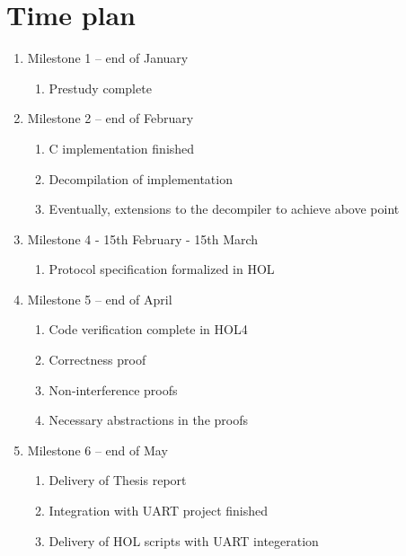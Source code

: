 \documentclass[fleqn]{kththesis}
\begin{document}
\section{Time plan}
\begin{enumerate}
\item Milestone 1 – end of January 
  \begin{enumerate}
      \item Prestudy complete
  \end{enumerate}
\item Milestone 2 – end of February
  \begin{enumerate}
      \item C implementation finished
      \item Decompilation of implementation
      \item Eventually, extensions to the decompiler to achieve above point
  \end{enumerate}
  \item Milestone 4 - 15th February - 15th March
  \begin{enumerate}
      \item Protocol specification formalized in HOL
  \end{enumerate}
  \item Milestone 5 – end of April
  \begin{enumerate}
      \item Code verification complete in HOL4
      \item Correctness proof
      \item Non-interference proofs
      \item Necessary abstractions in the proofs
  \end{enumerate}
\item Milestone 6 – end of May
  \begin{enumerate}
      \item Delivery of Thesis report
      \item Integration with UART project finished
      \item Delivery of HOL scripts with UART integeration
  \end{enumerate}
\end{enumerate}






\printbibliography[heading=bibintoc]

\appendix
\end{document}
